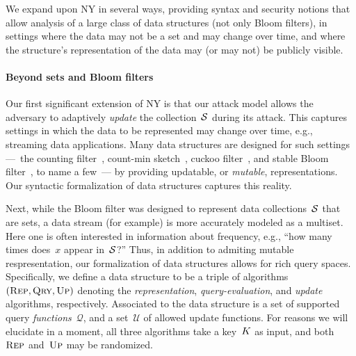 We expand upon NY in several ways, providing syntax and security
notions that allow analysis of a large class of data structures (not
only Bloom filters), in settings where the data may not be a set and
may change over time, and where the structure's representation of the data may (or may not) be publicly visible.
 
\paragraph{Beyond sets and Bloom filters}
Our first significant extension of NY is that our attack model allows the adversary to adaptively \emph{update} the
collection~$\mathcal{S}$ during its attack.  This captures settings in which
the data to be represented may change over time, e.g., streaming data applications.
Many data structures are designed for such settings ---~the counting filter~\cite{fan2000summary}, count-min
sketch~\cite{cormode2005improved}, cuckoo filter~\cite{fan2014cuckoo}, and
stable Bloom filter~\cite{deng2006approximately}, to name a few~--- by providing
updatable, or \emph{mutable}, representations.  Our syntactic formalization of
data structures captures this reality. 

%
Next, while the Bloom filter was designed to represent data collections~$\mathcal{S}$
that are sets, a data stream (for example) is more accurately 
modeled as a multiset.  Here one is often interested in information
about frequency, e.g., ``how many times does~$x$ appear
in~$\mathcal{S}$?''
Thus, in addition to admiting mutable respresentation, our
formalization of data structures allows for rich
query spaces.  Specifically, we define a data structure to be a triple of algorithms $(\textnormal{\textsc{Rep}},
\textnormal{\textsc{Qry}}, \textnormal{\textsc{Up}})$ denoting the \emph{representation}, \emph{query-evaluation}, and
\emph{update} algorithms, respectively. Associated to the data structure is a
set of supported query \emph{functions}~$\mathcal{Q}$, and a set~$\mathcal{U}$
of allowed update functions.  For reasons we will elucidate in a moment, all
three algorithms take a key~$K$ as input, and both~$\textnormal{\textsc{Rep}}$ and~$\textnormal{\textsc{Up}}$ may be
randomized.

